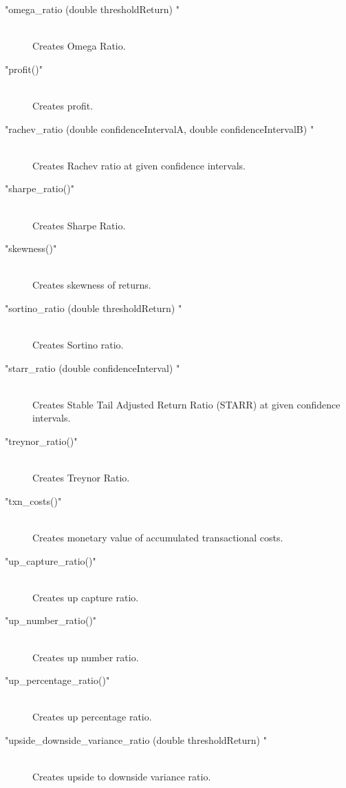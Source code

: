 \documentclass[letterpaper]{report}
\begin{document}
\begin{description}
\item["omega\_ratio (double thresholdReturn) "] \hfill \\ 
Creates Omega Ratio.


\item["profit()"] \hfill \\ 
Creates profit.


\item["rachev\_ratio (double confidenceIntervalA,
            double confidenceIntervalB) "] \hfill \\ 
Creates Rachev ratio  at given confidence intervals.



\item["sharpe\_ratio()"] \hfill \\ 
Creates Sharpe Ratio.


\item["skewness()"] \hfill \\ 
Creates skewness of  returns.


\item["sortino\_ratio (double thresholdReturn) "] \hfill \\ 
Creates Sortino ratio.


\item["starr\_ratio (double confidenceInterval) "] \hfill \\ 
Creates Stable Tail Adjusted Return Ratio (STARR)  
at given confidence intervals.

\item["treynor\_ratio()"] \hfill \\ 
Creates Treynor Ratio.


\item["txn\_costs()"] \hfill \\ 
Creates monetary value of accumulated transactional costs.


\item["up\_capture\_ratio()"] \hfill \\ 
Creates up capture ratio.


\item["up\_number\_ratio()"] \hfill \\ 
Creates up number ratio.


\item["up\_percentage\_ratio()"] \hfill \\ 
Creates up percentage ratio.


\item["upside\_downside\_variance\_ratio (double thresholdReturn) "] \hfill \\ 
Creates upside to downside variance ratio.



\end{description}
\end{document}
